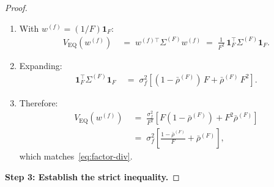 \documentclass[12pt,openany]{book}
\newcommand{\bfw}{\mathbf{w}}
\newcommand{\bfone}{\mathbf{1}}
\numberwithin{equation}{chapter}
\theoremstyle{plain}
\theoremstyle{definition}
\theoremstyle{remark}
\def\bfw{w}%
\begin{document}
\begin{proof}
\begin{enumerate}
  \item With $\bfw^{(f)} = (1/F)\bfone_F$:
        \begin{align}
          V_{\mathrm{EQ}}(\bfw^{(f)})
          &\;=\; \bfw^{(f)\top}\Sigma^{(F)}\bfw^{(f)}
           \;=\; \frac{1}{F^2}\,\bfone_F^\top\Sigma^{(F)}\bfone_F.
        \end{align}
  \item Expanding:
        \begin{align}
          \bfone_F^\top\Sigma^{(F)}\bfone_F
          &\;=\; \sigma_f^2\!\left[
                   (1-\bar{\rho}^{(F)})\,F
                   + \bar{\rho}^{(F)}\,F^2
                 \right].
        \end{align}
  \item Therefore:
        \begin{align}
          V_{\mathrm{EQ}}(\bfw^{(f)})
          &\;=\; \frac{\sigma_f^2}{F^2}
                 \left[F(1 - \bar{\rho}^{(F)})
                        + F^2\bar{\rho}^{(F)}\right]
          \nonumber\\
          &\;=\; \sigma_f^2
                 \left[\frac{1-\bar{\rho}^{(F)}}{F}
                        + \bar{\rho}^{(F)}\right],
          \label{eq:factor-div-exact}
        \end{align}
        which matches~\eqref{eq:factor-div}.
\end{enumerate}

\medskip
\noindent\textbf{Step 3: Establish the strict inequality.}


\end{proof}
\end{document}

